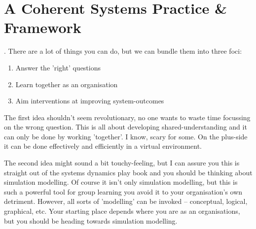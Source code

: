\chapter*{A Coherent Systems Practice \& Framework}



. There are a lot of things you can do, but we can bundle them into three foci:
\begin{enumerate}
	\item Answer the 'right' questions
	\item Learn together as an organisation
	\item Aim interventions at improving system-outcomes
\end{enumerate}
The first idea shouldn't seem revolutionary, no one wants to waste time focussing on the wrong question. This is all about developing shared-understanding and it can only be done by working 'together'. I know, scary for some. On the plus-side it can be done effectively and efficiently in a virtual environment.
 
The second idea might sound a bit touchy-feeling, but I can assure you this is straight out of the systems dynamics play book and you should be thinking about simulation modelling. Of course it isn't only simulation modelling, but this is such a powerful tool for group learning you avoid it to your organisation's own detriment. However, all sorts of 'modelling' can be invoked -- conceptual, logical, graphical, etc. Your starting place depends where you are as an organisations, but you should be heading towards simulation modelling.


